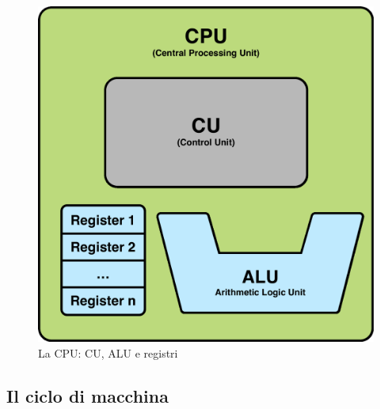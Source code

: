 \begin{frame}
	
	\begin{figure}[!htbp] 
		\centering
		\includegraphics[width=0.58\linewidth]{images/4_cpu/architecture_cpu_simple.pdf}
		\caption{La CPU: CU, ALU e registri}
		\label{fig:cpu_simple}
	\end{figure}
	 
\end{frame}




\subsection[Il ciclo di macchina]{Il ciclo di macchina}

